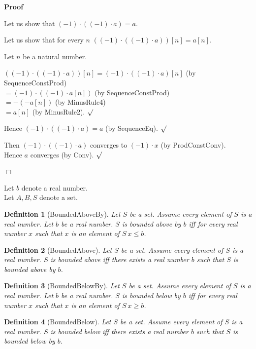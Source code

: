 \documentclass{article}
\newenvironment{forthel}{\begin{leftbar}}{\end{leftbar}}
\newenvironment{proof}{\noindent\textbf{Proof\ }}{\hspace*{\fill}$\Box$\medskip}
\newenvironment{subproof}{\begin{list}{}{}
		\item[\text{Proof}]}{\hfill $\surd$ \end{list}}
\newtheorem{definition}{Definition}
\newcommand{\cdottwo}{\cdot}
\newcommand{\dotequal}{=}
\begin{document}
\begin{forthel}
\begin{proof}
\begin{subproof}
			Let us show that $(-1) \cdottwo ((-1) \cdottwo a) = a$.
			\begin{subproof}
				Let us show that for every $n$ $((-1) \cdottwo ((-1) \cdottwo a))[n] = a[n]$.
				\begin{subproof}
					Let $n$ be a natural number.
					
					$((-1) \cdottwo ((-1) \cdottwo a))[n] \dotequal (-1) \cdot ((-1) \cdottwo a)[n]$ (by SequenceConstProd)\\
					$\dotequal (-1) \cdot ((-1) \cdot a[n])$ (by SequenceConstProd)\\
					$\dotequal -(-a[n])$ (by MinusRule4)\\
					$\dotequal a[n]$ (by MinusRule2).
				\end{subproof}
				
				Hence $(-1) \cdottwo ((-1) \cdottwo a) = a$ (by SequenceEq).
			\end{subproof}
			
			Then $(-1) \cdottwo ((-1) \cdottwo a)$ converges to $(-1) \cdot x$ (by ProdConstConv).\\
			Hence $a$ converges (by Conv).
		\end{subproof}
	\end{proof}
	
	\noindent Let $b$ denote a real number. 
	\\Let $A, B, S$ denote a set.
	
	
	\begin{definition}[BoundedAboveBy]
		Let $S$ be a set. Assume every element of $S$ is a real number. Let $b$ be a real number. $S$ is bounded above by $b$ iff for every real number $x$ such that $x$ is an element of $S \ x \leq b$.
	\end{definition}
	
	\begin{definition}[BoundedAbove]
		Let $S$ be a set. Assume every element of $S$ is a real number. $S$ is bounded above iff there exists a real number $b$ such that $S$ is bounded above by $b$.
	\end{definition}
	
	\begin{definition}[BoundedBelowBy]
		Let $S$ be a set. Assume every element of $S$ is a real number. Let $b$ be a real number. $S$ is bounded below by $b$ iff for every real number $x$ such that $x$ is an element of $S \ x \geq b$.
	\end{definition}
	
	\begin{definition}[BoundedBelow]
		Let $S$ be a set. Assume every element of $S$ is a real number. $S$ is bounded below iff there exists a real number $b$ such that $S$ is bounded below by $b$.
	\end{definition}
	

\end{forthel}
\end{document}
